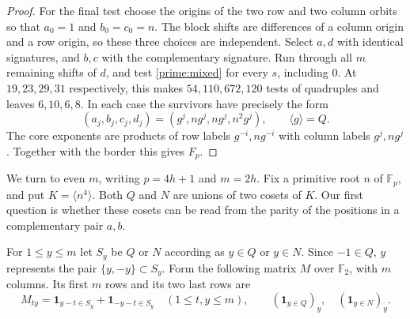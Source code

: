 \documentclass[11pt,a4paper]{article}
\numberwithin{equation}{section}
\begin{document}
\begin{proof}
For the final test choose the origins of the two row and two column orbits so that $a_0=1$ and $b_0=c_0=n$. The block shifts are differences of a column origin and a row origin, so these three choices are independent. Select $a,d$ with identical signatures, and $b,c$ with the complementary signature. Run through all $m$ remaining shifts of $d$, and test \eqref{prime:mixed} for every $s$, including $0$. At $19,23,29,31$ respectively, this makes $54,110,672,120$ tests of quadruples and leaves $6,10,6,8$. In each case the survivors have precisely the form
$$(a_j,b_j,c_j,d_j)=(g^j,ng^j,ng^j,n^2g^j),\qquad \langle g\rangle=Q.$$
The core exponents are products of row labels $g^{-i},ng^{-i}$ with column labels $g^j,ng^j$. Together with the border this gives $F_p$.
\end{proof}

\medskip
We turn to even $m$, writing $p=4h+1$ and $m=2h$. Fix a primitive root $n$ of $\mathbb F_p$, and put $K=\langle n^4\rangle$. Both $Q$ and $N$ are unions of two cosets of $K$. Our first question is whether these cosets can be read from the parity of the positions in a complementary pair $a,b$.

For $1\le y\le m$ let $S_y$ be $Q$ or $N$ according as $y\in Q$ or $y\in N$. Since $-1\in Q$, $y$ represents the pair $\{y,-y\}\subset S_y$. Form the following matrix $M$ over $\mathbb F_2$, with $m$ columns. Its first $m$ rows and its two last rows are
\[
 M_{ty}=\mathbf1_{y-t\in S_y}+\mathbf1_{-y-t\in S_y}
 \quad(1\le t,y\le m),\qquad
 (\mathbf1_{y\in Q})_y,\quad (\mathbf1_{y\in N})_y .
\]
\end{document}
